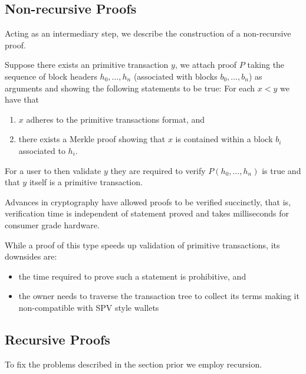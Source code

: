 \documentclass[9pt,oneside]{amsart}
\begin{document}
\begin{multicols}{2}
\subsection{Non-recursive Proofs}
Acting as an intermediary step, we describe the construction of a non-recursive proof.


Suppose there exists an primitive transaction $y$, we attach proof $P$ taking the sequence of block headers $h_{0}, \dots, h_{n}$ (associated with blocks $b_{0}, \dots, b_{n}$) as arguments and showing the following statements to be true:
For each $x < y$ we have that
\begin{enumerate}
    \item $x$ adheres to the primitive transactions format, and
    \item there exists a Merkle proof showing that $x$ is contained within a block $b_{i}$ associated to $h_{i}$.
\end{enumerate}

For a user to then validate $y$ they are required to verify $P(h_{0}, \dots, h_{n})$ is true and that $y$ itself is a primitive transaction.

Advances in cryptography have allowed proofs to be verified succinctly, that is, verification time is independent of statement proved and takes milliseconds for consumer grade hardware.

While a proof of this type speeds up validation of primitive transactions, its downsides are:
\begin{itemize}
    \item the time required to prove such a statement is prohibitive, and
    \item the owner needs to traverse the transaction tree to collect its terms making it non-compatible with SPV style wallets
\end{itemize}

\subsection{Recursive Proofs}
To fix the problems described in the section prior we employ recursion. 


\end{multicols}
\end{document}
